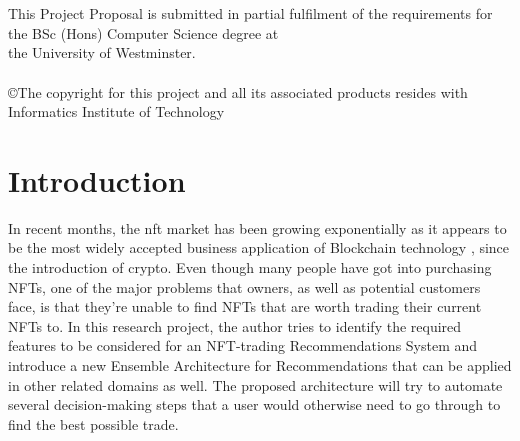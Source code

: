 \documentclass[a4paper, 12pt, oneside]{report}
\begin{document}
\begin{titlepage}
\begin{center}
\\[0.1cm]
\\[1cm]


\vfill
\large{This Project Proposal is submitted in partial fulfilment of the requirements for \\the BSc (Hons) Computer Science degree at \\the University of Westminster.} \\[0.1cm]

\vfill
{}\\[0.1cm]

\vfill
\large{\copyright The copyright for this project and all its associated products resides with Informatics Institute of Technology} \\[0.5cm]
\vfill
 

 
\end{center}
 
\end{titlepage}


\tableofcontents

{\let\clearpage\relax
\listoffigures}
{\let\clearpage\relax
\listoftables}
{\let\clearpage\relax
\printglossary[type=\acronymtype
]}


\onehalfspacing %

\chapter{Introduction}

\setcounter{page}{1} %

In recent months, the \Gls{nft} market has been growing exponentially as it appears to be the most widely accepted business application of Blockchain technology \autocite{dowling_is_2021}, since the introduction of crypto. Even though many people have got into purchasing NFTs, one of the major problems that owners, as well as potential customers face, is that they’re unable to find NFTs that are worth trading their current NFTs to. In this research project, the author tries to identify the required features to be considered for an NFT-trading Recommendations System and introduce a new Ensemble Architecture for Recommendations that can be applied in other related domains as well. The proposed architecture will try to automate several decision-making steps that a user would otherwise need to go through to find the best possible trade.
\end{document}
